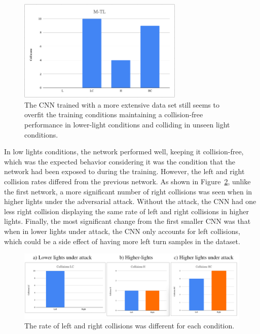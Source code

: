 \documentclass[12pt]{article}
\begin{document}
\begin{figure}[H]
\begin{center}
\includegraphics[width=0.7\textwidth]{figures/mtl-collisions-total.png}
\caption{The CNN trained with a more extensive data set still seems to overfit the training conditions maintaining a collision-free performance in lower-light conditions and colliding in unseen light conditions.}
\label{fig:mtlcollisions}
\end{center}
\end{figure}

In low lights conditions, the network performed well, keeping it collision-free, which was the expected behavior considering it was the condition that the network had been exposed to during the training. However, the left and right collision rates differed from the previous network. As shown in Figure~\ref{fig:mtlleftright}, unlike the first network, a more significant number of right collisions was seen when in higher lights under the adversarial attack. Without the attack, the CNN had one less right collision displaying the same rate of left and right collisions in higher lights. Finally, the most significant change from the first smaller CNN was that when in lower lights under attack, the CNN only accounts for left collisions, which could be a side effect of having more left turn samples in the dataset. 

\begin{figure}[H]
\begin{center}
\includegraphics[width=1.0\textwidth]{figures/mtlleftrightcollisions.png}
\caption{ The rate of left and right collisions was different for each condition.  }
\label{fig:mtlleftright}
\end{center}
\end{figure}
\end{document}
